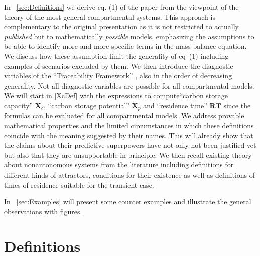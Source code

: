 \documentclass[journal abbreviation, manuscript]{copernicus}
\theoremstyle{definition}
\newcommand{\X}{\mathbf{X}}
\newcommand{\RT}{\mathbf{RT}}
\begin{document}
In ~\autoref{sec:Definitions} we derive eq. (1) of the paper 
from the viewpoint of the theory of the most
general compartmental systems.  
This approach is complementary to the original
presentation as it is not restricted to actually \emph{published} but
to mathematically \emph{possible} models, emphasizing the assumptions 
to be able to identify more and more specific terms in the mass balance equation.
We discuss how these assumption limit the generality of eq~(1) including examples of scenarios excluded by them. 
We then introduce the diagnostic variables of the ``Traceability Framework'' , also in the order of decreasing generality.
Not all diagnostic variables are possible for all compartmental models. 
We will start in \autoref{XcDef} with the expressions to compute``carbon storage capacity'' $\X_c$, ``carbon storage potential'' $\X_p$ and ``residence time'' $\RT$ since the formulas can be evaluated for all compartmental models. 
We address provable mathematical properties and the limited circumstances in which these definitions coincide with the meaning suggested by their names. 
This will already show that the claims about their predictive superpowers have not only not been justified yet but also that they are unsupportable in principle.
We then recall existing theory about
nonautonomous systems from the literature including definitions for different
kinds of attractors, conditions for their existence as well as definitions of
times of residence suitable for the transient case.  

In ~\autoref{sec:Examples} will present some counter examples and illustrate the general observations with figures.

\section{Definitions}
\label{sec:Definitions}
\end{document}
